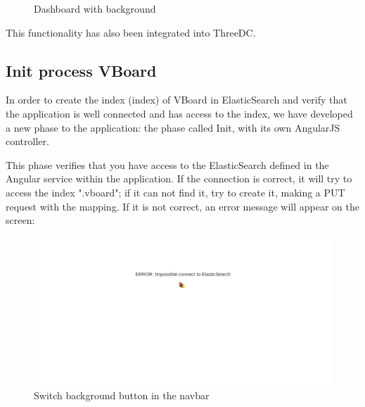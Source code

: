 \documentclass[a4paper, 12pt]{book}
\begin{document}
\begin{figure}[H]
 \centering
 \caption{Dashboard with background}
 \label{f:threedcexamples}
\end{figure}


This functionality has also been integrated into ThreeDC.



\subsection{Init process VBoard}

In order to create the index (index) of VBoard in ElasticSearch and verify that the application is well connected and has access to the index, we have developed a new phase to the application: the phase called Init, with its own AngularJS controller.

This phase verifies that you have access to the ElasticSearch defined in the Angular service within the application. If the connection is correct, it will try to access the index ".vboard"; if it can not find it, try to create it, making a PUT request with the mapping. If it is not correct, an error message will appear on the screen:

\begin{figure}[H]
  \centering
  \includegraphics[width=16cm, keepaspectratio]{img/development/errorconnectes}
  \caption{Switch background button in the navbar}
  \label{fig:examplestandalone}
\end{figure}
\end{document}
